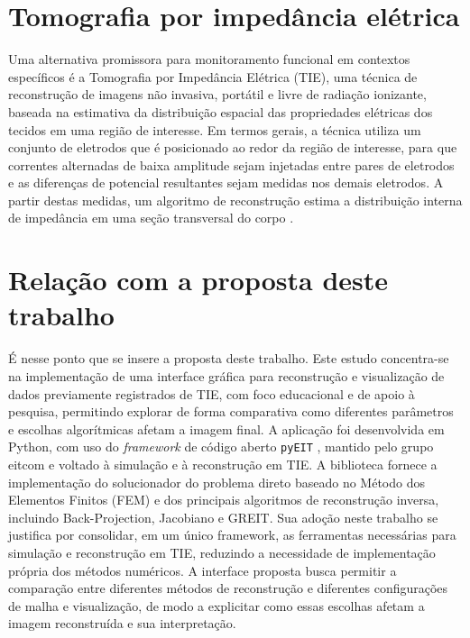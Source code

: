 \section{Tomografia por impedância elétrica}
\label{sec:introducao_tie}

Uma alternativa promissora para monitoramento funcional em contextos específicos é a Tomografia por Impedância Elétrica (TIE), uma técnica de reconstrução de imagens não invasiva, portátil e livre de radiação ionizante, baseada na estimativa da distribuição espacial das propriedades elétricas dos tecidos em uma região de interesse. Em termos gerais, a técnica utiliza um conjunto de eletrodos que é posicionado ao redor da região de interesse, para que correntes alternadas de baixa amplitude sejam injetadas entre pares de eletrodos e as diferenças de potencial resultantes sejam medidas nos demais eletrodos. A partir destas medidas, um algoritmo de reconstrução estima a distribuição interna de impedância em uma seção transversal do corpo \cite{NICEPulmoVista2019}.

\section{Relação com a proposta deste trabalho}


É nesse ponto que se insere a proposta deste trabalho. Este estudo concentra-se na implementação de uma interface gráfica para reconstrução e visualização de dados previamente registrados de TIE, com foco educacional e de apoio à pesquisa, permitindo explorar de forma comparativa como diferentes parâmetros e escolhas algorítmicas afetam a imagem final. A aplicação foi desenvolvida em Python, com uso do \textit{framework} de código aberto \texttt{pyEIT} \cite{pyEIT}, mantido pelo grupo eitcom e voltado à simulação e à reconstrução em TIE. A biblioteca fornece a implementação do solucionador do problema direto baseado no Método dos Elementos Finitos (FEM) e dos principais algoritmos de reconstrução inversa, incluindo Back-Projection, Jacobiano e GREIT. Sua adoção neste trabalho se justifica por consolidar, em um único framework, as ferramentas necessárias para simulação e reconstrução em TIE, reduzindo a necessidade de implementação própria dos métodos numéricos. A interface proposta busca permitir a comparação entre diferentes métodos de reconstrução e diferentes configurações de malha e visualização, de modo a explicitar como essas escolhas afetam a imagem reconstruída e sua interpretação.

